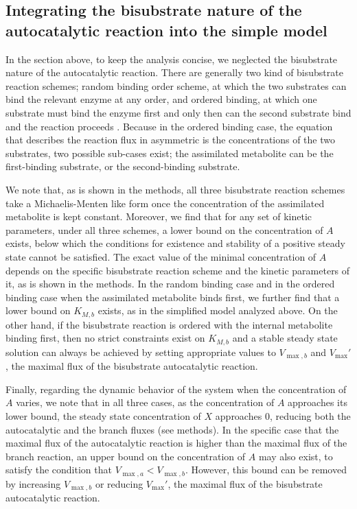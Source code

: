     \subsection{Integrating the bisubstrate nature of the autocatalytic reaction into the simple model}
    In the section above, to keep the analysis concise, we neglected the bisubstrate nature of the autocatalytic reaction.
    There are generally two kind of bisubstrate reaction schemes; random binding order scheme, at which the two substrates can bind the relevant enzyme at any order, and ordered binding, at which one substrate must bind the enzyme first and only then can the second substrate bind and the reaction proceeds \cite{Leskovac2003-li}.
    Because in the ordered binding case, the equation that describes the reaction flux in asymmetric is the concentrations of the two substrates, two possible sub-cases exist; the assimilated metabolite can be the first-binding substrate, or the second-binding substrate.

    We note that, as is shown in the methods, all three bisubstrate reaction schemes take a Michaelis-Menten like form once the concentration of the assimilated metabolite is kept constant.
    Moreover, we find that for any set of kinetic parameters, under all three schemes, a lower bound on the concentration of $A$ exists, below which the conditions for existence and stability of a positive steady state cannot be satisfied.
    The exact value of the minimal concentration of $A$ depends on the specific bisubstrate reaction scheme and the kinetic parameters of it, as is shown in the methods.
    In the random binding case and in the ordered binding case when the assimilated metabolite binds first, we further find that a lower bound on $K_{M,b}$ exists, as in the simplified model analyzed above.
    On the other hand, if the bisubstrate reaction is ordered with the internal metabolite binding first, then no strict constraints exist on $K_{M,b}$ and a stable steady state solution can always be achieved by setting appropriate values to $V_{\max,b}$ and $V_{\max}'$, the maximal flux of the bisubstrate autocatalytic reaction.
    
    Finally, regarding the dynamic behavior of the system when the concentration of $A$ varies, we note that in all three cases, as the concentration of $A$ approaches its lower bound, the steady state concentration of $X$ approaches $0$, reducing both the autocatalytic and the branch fluxes (see methods).
    In the specific case that the maximal flux of the autocatalytic reaction is higher than the maximal flux of the branch reaction, an upper bound on the concentration of $A$ may also exist, to satisfy the condition that $V_{\max,a}<V_{\max,b}$.
    However, this bound can be removed by increasing $V_{\max,b}$ or reducing $V_{\max}'$, the maximal flux of the bisubstrate autocatalytic reaction.
